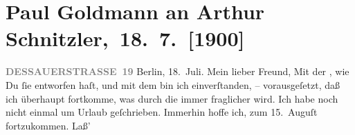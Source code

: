 

         
         \renewcommand{\erwaehntePersonen}{Personen: Paul Goldmann, Georg Hirschfeld, Alfred Kerr}
         \renewcommand{\erwaehnteInstitutionen}{Institutionen: Berliner Theater, Schauspielhaus Berlin}
         \renewcommand{\erwaehnteOrte}{Orte: Berlin, China, Dessauer Straße, Innsbruck, Lago di Garda, Reichenau an der Rax, Riva del Garda}
         \renewcommand{\erwaehnteWerke}{Werke: Der Schleier der Beatrice. Schauspiel in fünf Akten}
               \section[ Paul Goldmann an Arthur Schnitzler, 18. 7. {[}1900{]}]{ Paul Goldmann an Arthur Schnitzler, 18. 7. {[}1900{]}}\nopagebreak{}\rehead{ }\begin{ledgroupsized}[t]{13cm}\normalsize\beginnumbering \toendnotes[C]{\smallbreak\pagebreak[2]} 
\toendnotes[C]{\smallbreak}\pstart
           \noindent{}\raggedleft{}{\pb}\textcolor{gray}{\textbf{DESSAUERSTRASSE 19}}\pend
           \pstart
           Berlin, 18. Juli.\pend
           \pstart\center{}Mein lieber Freund,\pend\pstart
           Mit der \label{K_L02924-1v}\label{K_L02924-1h}, wie Du ſie entworfen haſt, und mit dem \label{K_L02924-2v}\label{K_L02924-2h} bin ich einverſtanden, – vorausgeſetzt, daß ich überhaupt fortkomme, was
               durch die \label{K_L02924-3v}\label{K_L02924-3h} immer fraglicher wird. Ich habe noch nicht einmal um Urlaub geſchrieben.
               Immerhin hoffe ich, zum 15. Auguſt fortzukommen. Laß’

\end{ledgroupsized}
